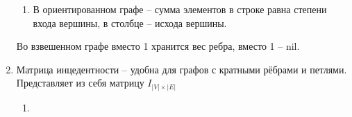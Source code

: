 \documentclass[a4paper,12pt]{article}
\begin{document}
\begin{enumerate}
\begin{enumerate}
        \item В ориентированном графе -- сумма элементов в строке равна степени входа вершины, в столбце -- исхода вершины.
    \end{enumerate}
    Во взвешенном графе вместо 1 хранится вес ребра, вместо 1 -- nil.
    \item Матрица инцедентности -- удобна для графов с кратными рёбрами и петлями. Представляет из себя матрицу $I_{|V| \times |E|}$
    \begin{enumerate}
        \item 
    \end{enumerate}
\end{enumerate}
\end{document}
